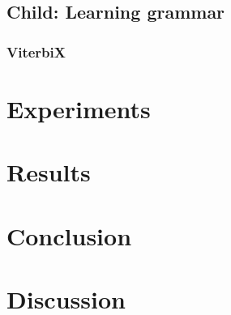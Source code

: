 \documentclass[a4paper]{article}
\begin{document}
\subsection{Child: Learning grammar} %
\subsubsection{ViterbiX} %
\section{Experiments}
\label{sec:experiments}
\section{Results}
\label{sec:results}
\section{Conclusion}
\label{sec:conclusion}
\section{Discussion}
\label{sec:discussion}



\end{document}
